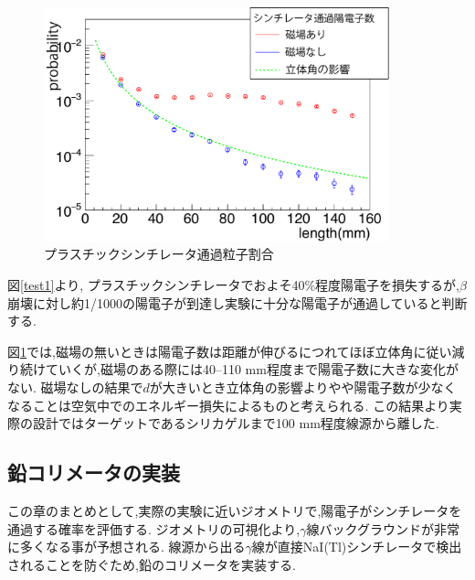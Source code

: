 \begin{figure}[htbp]
	\centering
		\includegraphics[width=10cm]{fig/scinti_test.pdf}
	\caption{プラスチックシンチレータ通過粒子割合}
	\label{scinti_test}
\end{figure}


図\ref{test1}より, プラスチックシンチレータでおよそ40\%程度陽電子を損失するが,$\beta$崩壊に対し約1/1000の陽電子が到達し実験に十分な陽電子が通過していると判断する.

図\ref{scinti_test}では,磁場の無いときは陽電子数は距離が伸びるにつれてほぼ立体角に従い減り続けていくが,磁場のある際には40--110 mm程度まで陽電子数に大きな変化がない.
磁場なしの結果で$d$が大きいとき立体角の影響よりやや陽電子数が少なくなることは空気中でのエネルギー損失によるものと考えられる.
この結果より実際の設計ではターゲットであるシリカゲルまで100 mm程度線源から離した.

\subsection{鉛コリメータの実装}
この章のまとめとして,実際の実験に近いジオメトリで,陽電子がシンチレータを通過する確率を評価する.
ジオメトリの可視化より,$\gamma$線バックグラウンドが非常に多くなる事が予想される.
線源から出る$\gamma$線が直接NaI(Tl)シンチレータで検出されることを防ぐため,鉛のコリメータを実装する.

